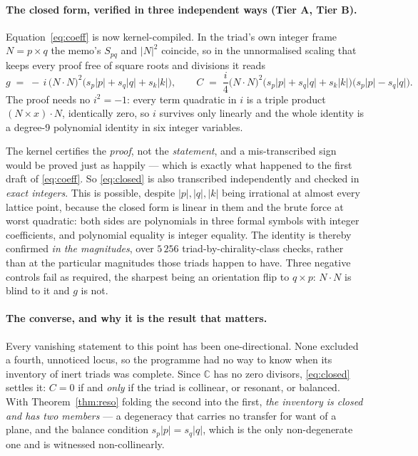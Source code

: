 \documentclass[11pt,a4paper]{article}
\newcommand{\tA}{\textcolor{TierA}{\textbf{Tier A}}}
\newcommand{\tB}{\textcolor{TierB}{\textbf{Tier B}}}
\newcommand{\C}{\mathbb{C}}
\theoremstyle{definition}
\theoremstyle{plain}
\begin{document}
\paragraph{The closed form, verified in three independent ways (\tA{}, \tB{}).}
Equation~\eqref{eq:coeff} is now kernel-compiled. In the triad's own integer frame $N=p\times q$ the
memo's $S_{pq}$ and $|N|^2$ coincide, so in the unnormalised scaling that keeps every proof free of
square roots and divisions it reads
\begin{equation}
  g \;=\; -\,i\,\bigl(N\!\cdot\!N\bigr)^{2}\bigl(s_p|p|+s_q|q|+s_k|k|\bigr),
  \qquad
  C \;=\; \frac{i}{4}\bigl(N\!\cdot\!N\bigr)^{2}
          \bigl(s_p|p|+s_q|q|+s_k|k|\bigr)\bigl(s_p|p|-s_q|q|\bigr).
  \label{eq:closed}
\end{equation}
The proof needs no $i^2=-1$: every term quadratic in $i$ is a triple product $(N\times x)\cdot N$,
identically zero, so $i$ survives only linearly and the whole identity is a degree-9 polynomial
identity in six integer variables.

The kernel certifies the \emph{proof}, not the \emph{statement}, and a mis-transcribed sign would be
proved just as happily --- which is exactly what happened to the first draft of \eqref{eq:coeff}. So
\eqref{eq:closed} is also transcribed independently and checked in \emph{exact integers}. This is
possible, despite $|p|,|q|,|k|$ being irrational at almost every lattice point, because the closed
form is linear in them and the brute force at worst quadratic: both sides are polynomials in three
formal symbols with integer coefficients, and polynomial equality is integer equality. The identity
is thereby confirmed \emph{in the magnitudes}, over $5\,256$ triad-by-chirality-class checks, rather
than at the particular magnitudes those triads happen to have. Three negative controls fail as
required, the sharpest being an orientation flip to $q\times p$: $N\!\cdot\!N$ is blind to it and
$g$ is not.

\paragraph{The converse, and why it is the result that matters.}
Every vanishing statement to this point has been one-directional. None excluded a fourth, unnoticed
locus, so the programme had no way to know when its inventory of inert triads was complete. Since
$\C$ has no zero divisors, \eqref{eq:closed} settles it: $C=0$ if and \emph{only} if the triad is
collinear, or resonant, or balanced. With Theorem~\ref{thm:reso} folding the second into the first,
\emph{the inventory is closed and has two members} --- a degeneracy that carries no transfer for
want of a plane, and the balance condition $s_p|p|=s_q|q|$, which is the only non-degenerate one and
is witnessed non-collinearly.
\end{document}
